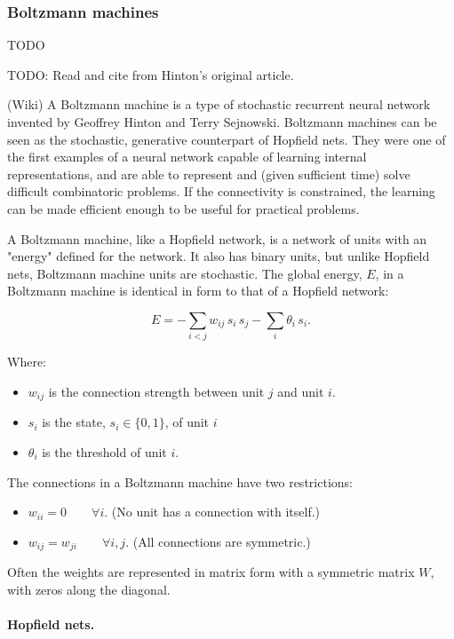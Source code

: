 \subsubsection{Boltzmann machines}
TODO \cite{ackley1985learning}

TODO: Read and cite from Hinton's original article. 

(Wiki) A Boltzmann machine is a type of stochastic recurrent neural network invented by Geoffrey Hinton and Terry Sejnowski. Boltzmann machines can be seen as the stochastic, generative counterpart of Hopfield nets. They were one of the first examples of a neural network capable of learning internal representations, and are able to represent and (given sufficient time) solve difficult combinatoric problems. If the connectivity is constrained, the learning can be made efficient enough to be useful for practical problems.

A Boltzmann machine, like a Hopfield network, is a network of units with an "energy" defined for the network. It also has binary units, but unlike Hopfield nets, Boltzmann machine units are stochastic. The global energy, $E$, in a Boltzmann machine is identical in form to that of a Hopfield network:

$$E = -\sum_{i<j} w_{ij} \, s_i \, s_j - \sum_i \theta_i \, s_i.$$

Where:
\begin{itemize}
    \item $w_{ij}$ is the connection strength between unit $j$ and unit $i$.
    \item $s_i$ is the state, $s_i \in \{0,1\}$, of unit $i$
    \item $\theta_i$ is the threshold of unit $i$.
\end{itemize}

The connections in a Boltzmann machine have two restrictions:
\begin{itemize}
    \item $w_{ii}=0\qquad \forall i$. (No unit has a connection with itself.)
    \item $w_{ij}=w_{ji}\qquad \forall i,j$. (All connections are symmetric.)
\end{itemize}

Often the weights are represented in matrix form with a symmetric matrix $W$, with zeros along the diagonal.

\paragraph{Hopfield nets.}

